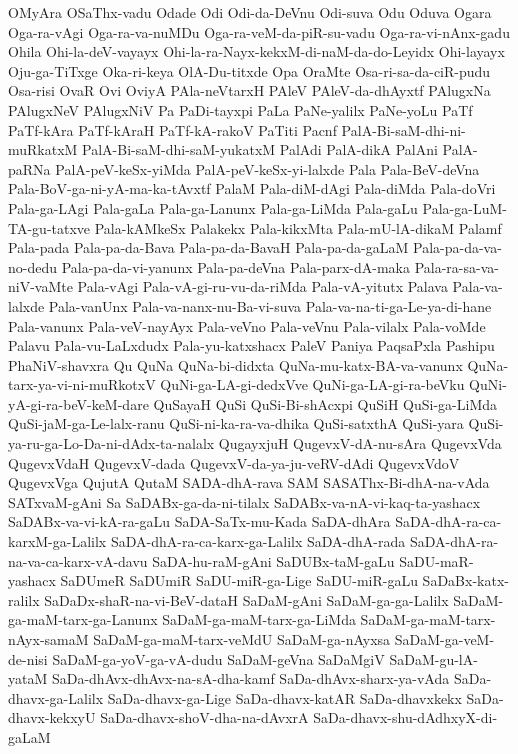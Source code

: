 {OMyAra
OSaThx-vadu
Odade
Odi
Odi-da-DeVnu
Odi-suva
Odu
Oduva
Ogara
Oga-ra-vAgi
Oga-ra-va-nuMDu
Oga-ra-veM-da-piR-su-vadu
Oga-ra-vi-nAnx-gadu
Ohila
Ohi-la-deV-vayayx
Ohi-la-ra-Nayx-kekxM-di-naM-da-do-Leyidx
Ohi-layayx
Oju-ga-TiTxge
Oka-ri-keya
OlA-Du-titxde
Opa
OraMte
Osa-ri-sa-da-ciR-pudu
Osa-risi
OvaR
Ovi
OviyA
PAla-neVtarxH
PAleV
PAleV-da-dhAyxtf
PAlugxNa
PAlugxNeV
PAlugxNiV
Pa
PaDi-tayxpi
PaLa
PaNe-yalilx
PaNe-yoLu
PaTf
PaTf-kAra
PaTf-kAraH
PaTf-kA-rakoV
PaTiti
Pacnf
PalA-Bi-saM-dhi-ni-muRkatxM
PalA-Bi-saM-dhi-saM-yukatxM
PalAdi
PalA-dikA
PalAni
PalA-paRNa
PalA-peV-keSx-yiMda
PalA-peV-keSx-yi-lalxde
Pala
Pala-BeV-deVna
Pala-BoV-ga-ni-yA-ma-ka-tAvxtf
PalaM
Pala-diM-dAgi
Pala-diMda
Pala-doVri
Pala-ga-LAgi
Pala-gaLa
Pala-ga-Lanunx
Pala-ga-LiMda
Pala-gaLu
Pala-ga-LuM-TA-gu-tatxve
Pala-kAMkeSx
Palakekx
Pala-kikxMta
Pala-mU-lA-dikaM
Palamf
Pala-pada
Pala-pa-da-Bava
Pala-pa-da-BavaH
Pala-pa-da-gaLaM
Pala-pa-da-va-no-dedu
Pala-pa-da-vi-yanunx
Pala-pa-deVna
Pala-parx-dA-maka
Pala-ra-sa-va-niV-vaMte
Pala-vAgi
Pala-vA-gi-ru-vu-da-riMda
Pala-vA-yitutx
Palava
Pala-va-lalxde
Pala-vanUnx
Pala-va-nanx-nu-Ba-vi-suva
Pala-va-na-ti-ga-Le-ya-di-hane
Pala-vanunx
Pala-veV-nayAyx
Pala-veVno
Pala-veVnu
Pala-vilalx
Pala-voMde
Palavu
Pala-vu-LaLxdudx
Pala-yu-katxshacx
PaleV
Paniya
PaqsaPxla
Pashipu
PhaNiV-shavxra
Qu
QuNa
QuNa-bi-didxta
QuNa-mu-katx-BA-va-vanunx
QuNa-tarx-ya-vi-ni-muRkotxV
QuNi-ga-LA-gi-dedxVve
QuNi-ga-LA-gi-ra-beVku
QuNi-yA-gi-ra-beV-keM-dare
QuSayaH
QuSi
QuSi-Bi-shAcxpi
QuSiH
QuSi-ga-LiMda
QuSi-jaM-ga-Le-lalx-ranu
QuSi-ni-ka-ra-va-dhika
QuSi-satxthA
QuSi-yara
QuSi-ya-ru-ga-Lo-Da-ni-dAdx-ta-nalalx
QugayxjuH
QugevxV-dA-nu-sAra
QugevxVda
QugevxVdaH
QugevxV-dada
QugevxV-da-ya-ju-veRV-dAdi
QugevxVdoV
QugevxVga
QujutA
QutaM
SADA-dhA-rava
SAM
SASAThx-Bi-dhA-na-vAda
SATxvaM-gAni
Sa
SaDABx-ga-da-ni-tilalx
SaDABx-va-nA-vi-kaq-ta-yashacx
SaDABx-va-vi-kA-ra-gaLu
SaDA-SaTx-mu-Kada
SaDA-dhAra
SaDA-dhA-ra-ca-karxM-ga-Lalilx
SaDA-dhA-ra-ca-karx-ga-Lalilx
SaDA-dhA-rada
SaDA-dhA-ra-na-va-ca-karx-vA-davu
SaDA-hu-raM-gAni
SaDUBx-taM-gaLu
SaDU-maR-yashacx
SaDUmeR
SaDUmiR
SaDU-miR-ga-Lige
SaDU-miR-gaLu
SaDaBx-katx-ralilx
SaDaDx-shaR-na-vi-BeV-dataH
SaDaM-gAni
SaDaM-ga-ga-Lalilx
SaDaM-ga-maM-tarx-ga-Lanunx
SaDaM-ga-maM-tarx-ga-LiMda
SaDaM-ga-maM-tarx-nAyx-samaM
SaDaM-ga-maM-tarx-veMdU
SaDaM-ga-nAyxsa
SaDaM-ga-veM-de-nisi
SaDaM-ga-yoV-ga-vA-dudu
SaDaM-geVna
SaDaMgiV
SaDaM-gu-lA-yataM
SaDa-dhAvx-dhAvx-na-sA-dha-kamf
SaDa-dhAvx-sharx-ya-vAda
SaDa-dhavx-ga-Lalilx
SaDa-dhavx-ga-Lige
SaDa-dhavx-katAR
SaDa-dhavxkekx
SaDa-dhavx-kekxyU
SaDa-dhavx-shoV-dha-na-dAvxrA
SaDa-dhavx-shu-dAdhxyX-di-gaLaM
}
